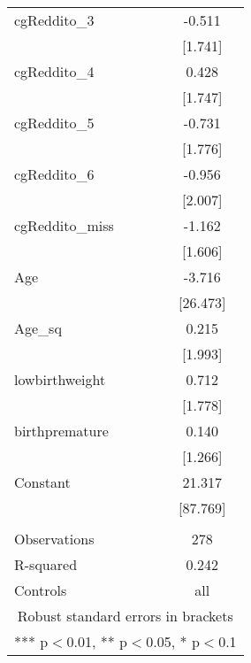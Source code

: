 \documentclass[]{article}
\begin{document}
\begin{tabular}{lc}
cgReddito\_3 & -0.511 \\
 & [1.741] \\
cgReddito\_4 & 0.428 \\
 & [1.747] \\
cgReddito\_5 & -0.731 \\
 & [1.776] \\
cgReddito\_6 & -0.956 \\
 & [2.007] \\
cgReddito\_miss & -1.162 \\
 & [1.606] \\
Age & -3.716 \\
 & [26.473] \\
Age\_sq & 0.215 \\
 & [1.993] \\
lowbirthweight & 0.712 \\
 & [1.778] \\
birthpremature & 0.140 \\
 & [1.266] \\
Constant & 21.317 \\
 & [87.769] \\
 &  \\
Observations & 278 \\
R-squared & 0.242 \\
 Controls & all \\ \hline
\multicolumn{2}{c}{ Robust standard errors in brackets} \\
\multicolumn{2}{c}{ *** p$<$0.01, ** p$<$0.05, * p$<$0.1} \\
\end{tabular}
\end{document}
